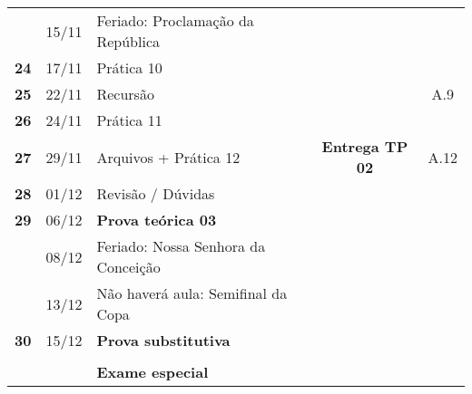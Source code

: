 \documentclass[a4paper, 11pt]{article}
\begin{document}
\begin{longtable}{>{\bfseries}ccl>{\bfseries}cc}
\rowcolor{green!25} & 15/11 & Feriado: Proclamação da República &  & \\
\rowcolor{yellow!25} 24 & 17/11 & Prática 10 &  & \\
\rowcolor{gray!25} 25 & 22/11 & Recursão &  & A.9\\
\rowcolor{yellow!25} 26 & 24/11 & Prática 11 &  & \\
\rowcolor{gray!25} 27 & 29/11 & Arquivos + Prática 12 & Entrega TP 02 & A.12\\
\rowcolor{yellow!25} 28 & 01/12 & Revisão / Dúvidas &  & \\
\rowcolor{red!15} 29 & 06/12 & \textbf{Prova teórica 03} &  & \\
\rowcolor{green!25} & 08/12 & Feriado: Nossa Senhora da Conceição &  & \\
\rowcolor{green!25} & 13/12 & Não haverá aula: Semifinal da Copa &  & \\
\rowcolor{red!15} 30 & 15/12 & \textbf{Prova substitutiva} &  & \\
 &  &  &  & \\
\rowcolor{red!15} &  & \textbf{Exame especial} &  & \\
\bottomrule
\end{longtable}
\end{document}
